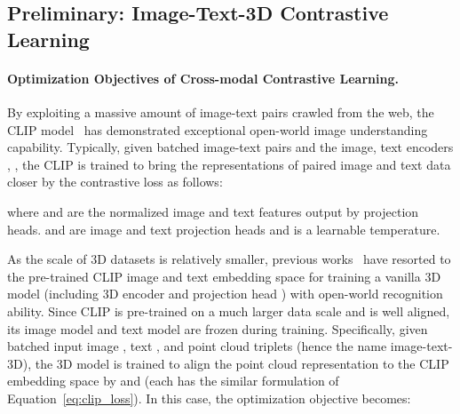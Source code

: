 \documentclass{article} \usepackage{iclr2024_conference,times}
\begin{document}
\subsection{Preliminary: Image-Text-3D Contrastive Learning}
\label{subsec:preliminary}
\paragraph{Optimization Objectives of Cross-modal Contrastive Learning.}
By exploiting a massive amount of image-text pairs crawled from the web, the CLIP model~\citep{openai_clip} has demonstrated exceptional open-world image understanding capability.
Typically, given batched image-text pairs  and the image, text encoders , , 
the CLIP is trained to bring the representations of paired image and text data  closer by the contrastive loss  as follows:

where  and  are the  normalized image and text features output by projection heads. 
 and  are image and text projection heads and  is a learnable temperature.  

As the scale of 3D datasets is relatively smaller, previous works~\citep{ulip, ulip2, openshape, zeng2023clip2} have resorted to the pre-trained CLIP image and text embedding space for training a vanilla 3D model  (including 3D encoder  and projection head ) with open-world recognition ability. 
Since CLIP is pre-trained on a much larger data scale and is well aligned, its image model  and text model  are frozen during training.
Specifically, given batched  input image , text , and point cloud  triplets  (hence the name image-text-3D), the 3D model  is trained to align the point cloud representation  to the CLIP embedding space by  and  (each has the similar formulation of Equation~\ref{eq:clip_loss}).
In this case, the optimization objective becomes:
 

\begin{table*}[t]
  \centering
  \setlength{\tabcolsep}{11pt}
    \caption{The summary and comparisons between the baseline and our improved training recipe.}
    \vspace{-1em}
  \label{tab:bag_of_tricks_summarize}
  \vspace{-.5em}
\end{table*}
%
\end{document}
